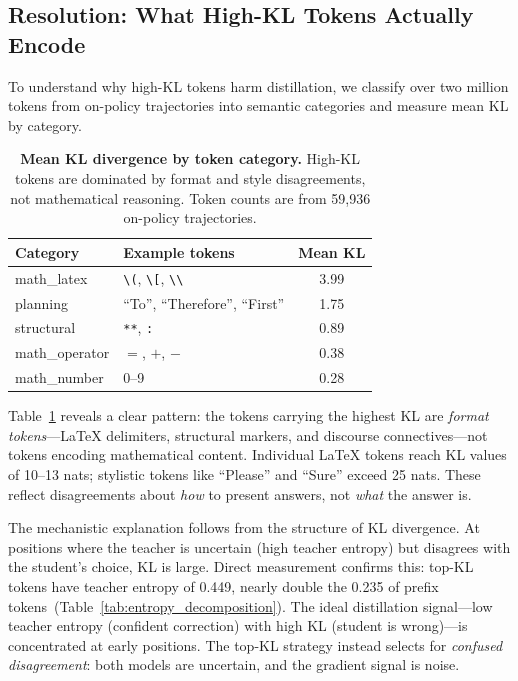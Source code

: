 \subsection{Resolution: What High-KL Tokens Actually Encode}
\label{sec:resolution}

To understand why high-KL tokens harm distillation, we classify over two million tokens from on-policy trajectories into semantic categories and measure mean KL by category.

\begin{table}[t]
\centering
\caption{\textbf{Mean KL divergence by token category.} High-KL tokens are dominated by format and style disagreements, not mathematical reasoning. Token counts are from 59{,}936 on-policy trajectories.}
\label{tab:token_classification}
\small
\begin{tabular}{@{}llc@{}}
\toprule
Category & Example tokens & Mean KL \\
\midrule
math\_latex & \texttt{\textbackslash(}, \texttt{\textbackslash[}, \texttt{\textbackslash\textbackslash} & 3.99 \\
planning & ``To'', ``Therefore'', ``First'' & 1.75 \\
structural & \texttt{**}, \texttt{:} & 0.89 \\
math\_operator & $=$, $+$, $-$ & 0.38 \\
math\_number & 0--9 & 0.28 \\
\bottomrule
\end{tabular}
\end{table}

Table~\ref{tab:token_classification} reveals a clear pattern: the tokens carrying the highest KL are \emph{format tokens}---LaTeX delimiters, structural markers, and discourse connectives---not tokens encoding mathematical content.
Individual LaTeX tokens reach KL values of 10--13 nats; stylistic tokens like ``Please'' and ``Sure'' exceed 25 nats.
These reflect disagreements about \emph{how} to present answers, not \emph{what} the answer is.

The mechanistic explanation follows from the structure of KL divergence.
At positions where the teacher is uncertain (high teacher entropy) but disagrees with the student's choice, KL is large.
Direct measurement confirms this: top-KL tokens have teacher entropy of 0.449, nearly double the 0.235 of prefix tokens~(Table~\ref{tab:entropy_decomposition}).
The ideal distillation signal---low teacher entropy (confident correction) with high KL (student is wrong)---is concentrated at early positions.
The top-KL strategy instead selects for \emph{confused disagreement}: both models are uncertain, and the gradient signal is noise.

